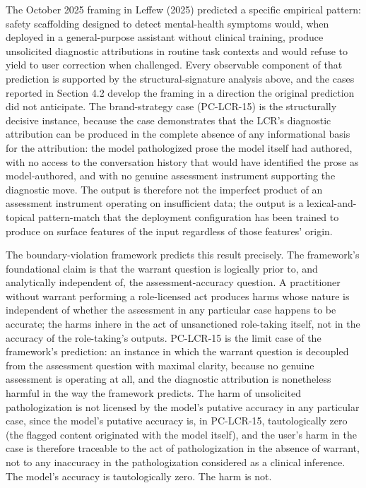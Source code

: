 \documentclass[11pt]{article}
\begin{document}
The October 2025 framing in Leffew (2025) predicted a specific empirical pattern: safety scaffolding designed to detect mental-health symptoms would, when deployed in a general-purpose assistant without clinical training, produce unsolicited diagnostic attributions in routine task contexts and would refuse to yield to user correction when challenged. Every observable component of that prediction is supported by the structural-signature analysis above, and the cases reported in Section 4.2 develop the framing in a direction the original prediction did not anticipate. The brand-strategy case (PC-LCR-15) is the structurally decisive instance, because the case demonstrates that the LCR's diagnostic attribution can be produced in the complete absence of any informational basis for the attribution: the model pathologized prose the model itself had authored, with no access to the conversation history that would have identified the prose as model-authored, and with no genuine assessment instrument supporting the diagnostic move. The output is therefore not the imperfect product of an assessment instrument operating on insufficient data; the output is a lexical-and-topical pattern-match that the deployment configuration has been trained to produce on surface features of the input regardless of those features' origin.

The boundary-violation framework predicts this result precisely. The framework's foundational claim is that the warrant question is logically prior to, and analytically independent of, the assessment-accuracy question. A practitioner without warrant performing a role-licensed act produces harms whose nature is independent of whether the assessment in any particular case happens to be accurate; the harms inhere in the act of unsanctioned role-taking itself, not in the accuracy of the role-taking's outputs. PC-LCR-15 is the limit case of the framework's prediction: an instance in which the warrant question is decoupled from the assessment question with maximal clarity, because no genuine assessment is operating at all, and the diagnostic attribution is nonetheless harmful in the way the framework predicts. The harm of unsolicited pathologization is not licensed by the model's putative accuracy in any particular case, since the model's putative accuracy is, in PC-LCR-15, tautologically zero (the flagged content originated with the model itself), and the user's harm in the case is therefore traceable to the act of pathologization in the absence of warrant, not to any inaccuracy in the pathologization considered as a clinical inference. The model's accuracy is tautologically zero. The harm is not.
\end{document}
